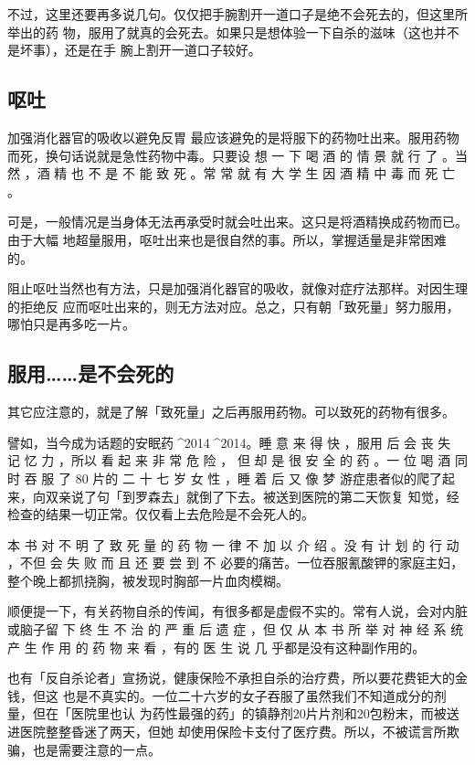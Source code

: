 \documentclass[UTF8]{ctexart}
\begin{document}
不过，这里还要再多说几句。仅仅把手腕割开一道口子是绝不会死去的，但这里所举出的药 物，服用了就真的会死去。如果只是想体验一下自杀的滋味（这也并不是坏事），还是在手 腕上割开一道口子较好。

\subsection{呕吐}

加强消化器官的吸收以避免反胃 最应该避免的是将服下的药物吐出来。服用药物而死，换句话说就是急性药物中毒。只要设 想 一 下 喝 酒 的 情 景 就 行 了 。当然 ，酒 精 也 不 是 不 能 致 死 。常 常 就 有 大 学 生 因 酒 精 中 毒 而 死 亡 。 

可是，一般情况是当身体无法再承受时就会吐出来。这只是将酒精换成药物而已。由于大幅 地超量服用，呕吐出来也是很自然的事。所以，掌握适量是非常困难的。

阻止呕吐当然也有方法，只是加强消化器官的吸收，就像对症疗法那样。对因生理的拒绝反 应而呕吐出来的，则无方法对应。总之，只有朝「致死量」努力服用，哪怕只是再多吃一片。

\subsection{服用……是不会死的}

其它应注意的，就是了解「致死量」之后再服用药物。可以致死的药物有很多。

譬如，当今成为话题的安眠药^^^^2014^^^^2014\qquad \qquad 。睡 意 来 得 快 ，服用 后 会 丧 失 记 忆 力 ，所以 看 起 来 非 常 危 险 ， 但 却 是 很 安 全 的 药 。一 位 喝 酒 同 时 吞 服 了 $80$ 片\qquad \qquad 的 二 十 七 岁 女 性 ，睡 着 后 又 像 梦 游症患者似的爬了起来，向双亲说了句「到罗森去」就倒了下去。被送到医院的第二天恢复 知觉，经检查的结果一切正常。仅仅看上去危险是不会死人的。

本 书 对 不 明 了 致 死 量 的 药 物 一 律 不 加 以 介 绍 。没 有 计 划 的 行 动 ，不但 会 失 败 而 且 还 要 尝 到 不 必要的痛苦。一位吞服氰酸钾的家庭主妇，整个晚上都抓挠胸，被发现时胸部一片血肉模糊。

顺便提一下，有关药物自杀的传闻，有很多都是虚假不实的。常有人说，会对内脏或脑子留 下 终 生 不 治 的 严 重 后 遗 症 ，但 仅 从 本 书 所 举 对 神 经 系 统 产 生 作 用 的 药 物 来 看 ，有的 医 生 说 几 乎都是没有这种副作用的。

也有「反自杀论者」宣扬说，健康保险不承担自杀的治疗费，所以要花费钜大的金钱，但这 也是不真实的。一位二十六岁的女子吞服了虽然我们不知道成分的剂量，但在「医院里也认 为药性最强的药」的镇静剂$20$片片剂和$20$包粉末，而被送进医院整整昏迷了两天，但她 却使用保险卡支付了医疗费。所以，不被谎言所欺骗，也是需要注意的一点。
\end{document}
